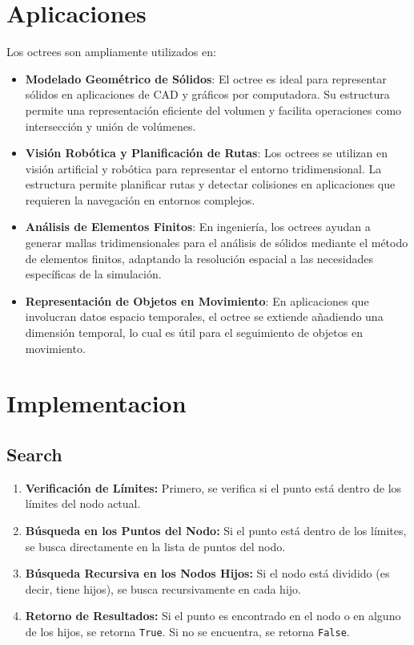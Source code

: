 \documentclass{article}
\begin{document}
\section{Aplicaciones}
Los octrees son ampliamente utilizados en:
\begin{itemize}
    \item \textbf{Modelado Geométrico de Sólidos}: El octree es ideal para representar sólidos en aplicaciones de CAD y gráficos por computadora. Su estructura permite una representación eficiente del volumen y facilita operaciones como intersección y unión de volúmenes.
    \item \textbf{Visión Robótica y Planificación de Rutas}: Los octrees se utilizan en visión artificial y robótica para representar el entorno tridimensional. La estructura permite planificar rutas y detectar colisiones en aplicaciones que requieren la navegación en entornos complejos.
    \item \textbf{Análisis de Elementos Finitos}: En ingeniería, los octrees ayudan a generar mallas tridimensionales para el análisis de sólidos mediante el método de elementos finitos, adaptando la resolución espacial a las necesidades específicas de la simulación.
    \item \textbf{Representación de Objetos en Movimiento}: En aplicaciones que involucran datos espacio temporales, el octree se extiende añadiendo una dimensión temporal, lo cual es útil para el seguimiento de objetos en movimiento.
\end{itemize}
\section{Implementacion}
\subsection{Search}
\begin{enumerate}
    \item \textbf{Verificación de Límites:} Primero, se verifica si el punto está dentro de los límites del nodo actual.
    
    
    \item \textbf{Búsqueda en los Puntos del Nodo:} Si el punto está dentro de los límites, se busca directamente en la lista de puntos del nodo.
    
    
    \item \textbf{Búsqueda Recursiva en los Nodos Hijos:} Si el nodo está dividido (es decir, tiene hijos), se busca recursivamente en cada hijo.
    
    
    \item \textbf{Retorno de Resultados:} Si el punto es encontrado en el nodo o en alguno de los hijos, se retorna \texttt{True}. Si no se encuentra, se retorna \texttt{False}.
    
\end{enumerate}
\end{document}
